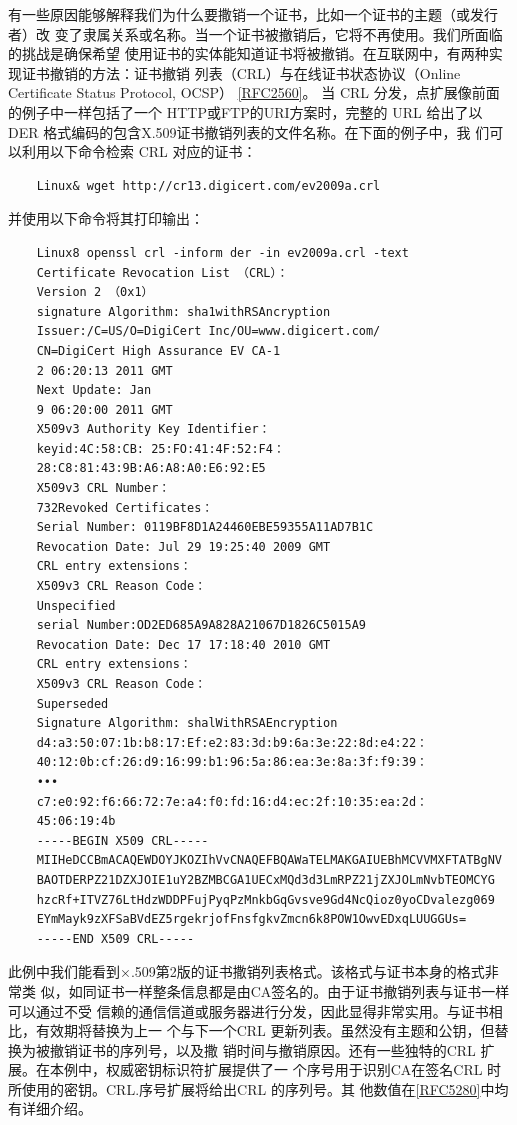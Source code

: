 有一些原因能够解释我们为什么要撒销一个证书，比如一个证书的主题（或发行者）改
变了隶属关系或名称。当一个证书被撤销后，它将不再使用。我们所面临的挑战是确保希望
使用证书的实体能知道证书将被撤销。在互联网中，有两种实现证书撤销的方法：证书撤销
列表（CRL）与在线证书状态协议（Online Certificate Status Protocol, OCSP） \href{https://www.rfc-editor.org/rfc/rfc2560}{[RFC2560]}。
当 CRL 分发，点扩展像前面的例子中一样包括了一个 HTTP或FTP的URI方案时，完整的
URL 给出了以 DER 格式编码的包含X.509证书撤销列表的文件名称。在下面的例子中，我
们可以利用以下命令检索 CRL 对应的证书：
\begin{verbatim}
    Linux& wget http://cr13.digicert.com/ev2009a.crl
\end{verbatim}
并使用以下命令将其打印输出：
\begin{verbatim}
    Linux8 openssl crl -inform der -in ev2009a.crl -text
    Certificate Revocation List （CRL）：
    Version 2 （0x1）
    signature Algorithm: sha1withRSAncryption
    Issuer:/C=US/O=DigiCert Inc/OU=www.digicert.com/
    CN=DigiCert High Assurance EV CA-1
    2 06:20:13 2011 GMT
    Next Update: Jan
    9 06:20:00 2011 GMT
    X509v3 Authority Key Identifier：
    keyid:4C:58:CB: 25:FO:41:4F:52:F4：
    28:C8:81:43:9B:A6:A8:A0:E6:92:E5
    X509v3 CRL Number：
    732Revoked Certificates：
    Serial Number: 0119BF8D1A24460EBE59355A11AD7B1C
    Revocation Date: Jul 29 19:25:40 2009 GMT
    CRL entry extensions：
    X509v3 CRL Reason Code：
    Unspecified
    serial Number:OD2ED685A9A828A21067D1826C5015A9
    Revocation Date: Dec 17 17:18:40 2010 GMT
    CRL entry extensions：
    X509v3 CRL Reason Code：
    Superseded
    Signature Algorithm: shalWithRSAEncryption
    d4:a3:50:07:1b:b8:17:Ef:e2:83:3d:b9:6a:3e:22:8d:e4:22：
    40:12:0b:cf:26:d9:16:99:b1:96:5a:86:ea:3e:8a:3f:f9:39：
    •••
    c7:e0:92:f6:66:72:7e:a4:f0:fd:16:d4:ec:2f:10:35:ea:2d：
    45:06:19:4b
    -----BEGIN X509 CRL-----
    MIIHeDCCBmACAQEWDOYJKOZIhVvCNAQEFBQAWaTELMAKGAIUEBhMCVVMXFTATBgNV
    BAOTDERPZ21DZXJOIE1uY2BZMBCGA1UECxMQd3d3LmRPZ21jZXJOLmNvbTEOMCYG
    hzcRf+ITVZ76LtHdzWDDPFujPyqPzMnkbGqGvsve9Gd4NcQioz0yoCDvalezg069
    EYmMayk9zXFSaBVdEZ5rgekrjofFnsfgkvZmcn6k8POW1OwvEDxqLUUGGUs=
    -----END X509 CRL-----
\end{verbatim}
此例中我们能看到×.509第2版的证书撒销列表格式。该格式与证书本身的格式非常类
似，如同证书一样整条信息都是由CA签名的。由于证书撤销列表与证书一样可以通过不受
信赖的通信信道或服务器进行分发，因此显得非常实用。与证书相比，有效期将替换为上一
个与下一个CRL 更新列表。虽然没有主题和公钥，但替换为被撤销证书的序列号，以及撒
销时间与撤销原因。还有一些独特的CRL 扩展。在本例中，权威密钥标识符扩展提供了一
个序号用于识别CA在签名CRL 时所使用的密钥。CRL.序号扩展将给出CRL 的序列号。其
他数值在\href{https://www.rfc-editor.org/rfc/rfc5280}{[RFC5280]}中均有详细介绍。


